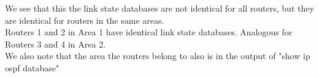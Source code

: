 We see that this the link state databases are not identical for all routers, but they are identical for routers in the same areas. \\
Routers 1 and 2 in Area 1 have identical link state databases. Analogous for Routers 3 and 4 in Area 2. \\
We also note that the area the routers belong to also is in the output of "show ip ospf database"
